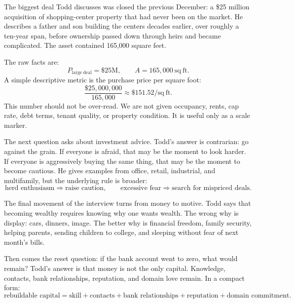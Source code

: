 The biggest deal Todd discusses was closed the previous December: a \$25 million acquisition of shopping-center property that had never been on the market. He describes a father and son building the centers decades earlier, over roughly a ten-year span, before ownership passed down through heirs and became complicated. The asset contained 165,000 square feet.

The raw facts are:
\begin{equation}
P_{\mathrm{large\ deal}}=\$25\mathrm{M},
\qquad
A=165{,}000\ \mathrm{sq\ ft}.
\end{equation}
A simple descriptive metric is the purchase price per square foot:
\begin{equation}
\frac{\$25{,}000{,}000}{165{,}000}
\approx
\$151.52/\mathrm{sq\ ft}.
\end{equation}
This number should not be over-read. We are not given occupancy, rents, cap rate, debt terms, tenant quality, or property condition. It is useful only as a scale marker.

The next question asks about investment advice. Todd's answer is contrarian: go against the grain. If everyone is afraid, that may be the moment to look harder. If everyone is aggressively buying the same thing, that may be the moment to become cautious. He gives examples from office, retail, industrial, and multifamily, but the underlying rule is broader:
\begin{equation}
\text{herd enthusiasm} \Rightarrow \text{raise caution},
\qquad
\text{excessive fear} \Rightarrow \text{search for mispriced deals}.
\end{equation}

The final movement of the interview turns from money to motive. Todd says that becoming wealthy requires knowing why one wants wealth. The wrong why is display: cars, dinners, image. The better why is financial freedom, family security, helping parents, sending children to college, and sleeping without fear of next month's bills.

Then comes the reset question: if the bank account went to zero, what would remain? Todd's answer is that money is not the only capital. Knowledge, contacts, bank relationships, reputation, and domain love remain. In a compact form:
\begin{equation}
\text{rebuildable capital}
=
\text{skill}
+
\text{contacts}
+
\text{bank relationships}
+
\text{reputation}
+
\text{domain commitment}.
\end{equation}

